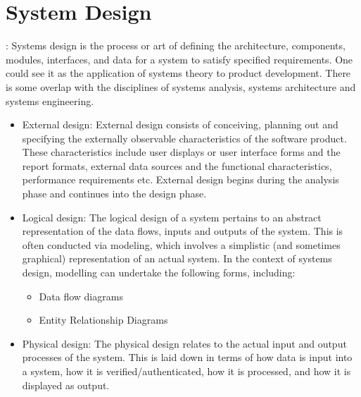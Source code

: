 
\section{System Design} : Systems design is the process or art of defining the architecture, components, modules, interfaces, and data for a system to satisfy specified requirements. One could see it as the application of systems theory to product development. There is some overlap with the disciplines of systems analysis, systems architecture and systems engineering.
\begin{itemize}
\item  External design: External design consists of conceiving, planning out and specifying the externally observable characteristics of the software product. These characteristics include user displays or user interface forms and the report formats, external data sources and the functional characteristics, performance requirements etc. External design begins during the analysis phase
and continues into the design phase.
\item  Logical design: The logical design of a system pertains to an abstract representation of the data flows, inputs and outputs of the system. This is often conducted via modeling, which involves a simplistic (and sometimes graphical) representation of an actual system. In the context of systems design, modelling can undertake the following forms, including:
\begin{itemize}
\item Data flow diagrams
\item Entity Relationship Diagrams
\end{itemize}
\item  Physical design: The physical design relates to the actual input and output processes of the system. This is laid down in terms of how data is input into a system, how it is verified/authenticated, how it is processed, and how it is displayed as output.
\end{itemize}

